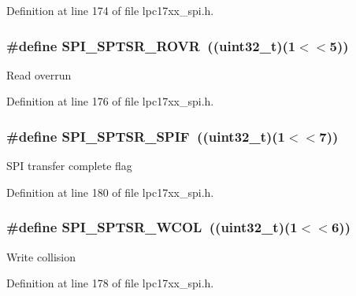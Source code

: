 \-Definition at line 174 of file lpc17xx\-\_\-spi.\-h.

\hypertarget{group___s_p_i___private___macros_gacb042b3e4aace8d208fdf39a83a7077e}{
\subsubsection[{\-S\-P\-I\-\_\-\-S\-P\-T\-S\-R\-\_\-\-R\-O\-V\-R}]{\setlength{\rightskip}{0pt plus 5cm}\#define {\bf \-S\-P\-I\-\_\-\-S\-P\-T\-S\-R\-\_\-\-R\-O\-V\-R}~((uint32\-\_\-t)(1$<$$<$5))}}\label{group___s_p_i___private___macros_gacb042b3e4aace8d208fdf39a83a7077e}
\-Read overrun 

\-Definition at line 176 of file lpc17xx\-\_\-spi.\-h.

\hypertarget{group___s_p_i___private___macros_ga392be5862f9189f6d6a39f2af8ae3db0}{
\subsubsection[{\-S\-P\-I\-\_\-\-S\-P\-T\-S\-R\-\_\-\-S\-P\-I\-F}]{\setlength{\rightskip}{0pt plus 5cm}\#define {\bf \-S\-P\-I\-\_\-\-S\-P\-T\-S\-R\-\_\-\-S\-P\-I\-F}~((uint32\-\_\-t)(1$<$$<$7))}}\label{group___s_p_i___private___macros_ga392be5862f9189f6d6a39f2af8ae3db0}
\-S\-P\-I transfer complete flag 

\-Definition at line 180 of file lpc17xx\-\_\-spi.\-h.

\hypertarget{group___s_p_i___private___macros_ga935f52864bfe86b53e04c89ed095a451}{
\subsubsection[{\-S\-P\-I\-\_\-\-S\-P\-T\-S\-R\-\_\-\-W\-C\-O\-L}]{\setlength{\rightskip}{0pt plus 5cm}\#define {\bf \-S\-P\-I\-\_\-\-S\-P\-T\-S\-R\-\_\-\-W\-C\-O\-L}~((uint32\-\_\-t)(1$<$$<$6))}}\label{group___s_p_i___private___macros_ga935f52864bfe86b53e04c89ed095a451}
\-Write collision 

\-Definition at line 178 of file lpc17xx\-\_\-spi.\-h.

